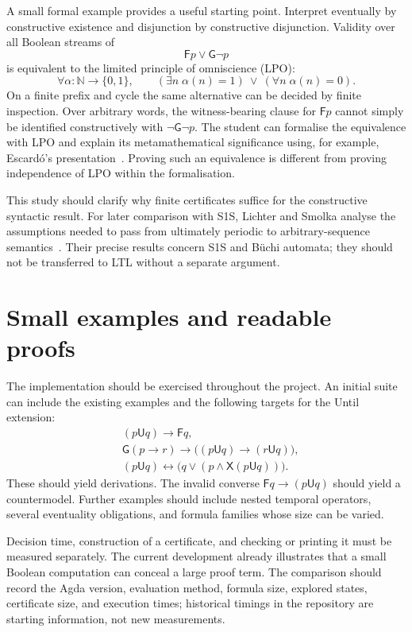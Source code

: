 \documentclass[11pt,a4paper]{article}
\newcommand{\Next}{\mathsf{X}}
\newcommand{\Always}{\mathsf{G}}
\newcommand{\Event}{\mathsf{F}}
\newcommand{\Until}{\mathbin{\mathsf{U}}}
\begin{document}
A small formal example provides a useful starting point. Interpret
eventually by constructive existence and disjunction by constructive
disjunction. Validity over all Boolean streams of
\[
 \Event p\lor\Always\neg p
\]
is equivalent to the limited principle of omniscience (LPO):
\[
 \forall\alpha:\mathbb N\to\{0,1\},\qquad
 (\exists n\;\alpha(n)=1)\ \lor\ (\forall n\;\alpha(n)=0).
\]
On a finite prefix and cycle the same alternative can be decided by finite
inspection. Over arbitrary words, the witness-bearing clause for
$\Event p$ cannot simply be identified constructively with
$\neg\Always\neg p$. The student can formalise the equivalence with LPO
and explain its metamathematical significance using, for example,
Escard\'o's presentation~\cite{escardo}. Proving such an equivalence is
different from proving independence of LPO within the formalisation.

This study should clarify why finite certificates suffice for the
constructive syntactic result. For later comparison with S1S,
Lichter and Smolka analyse the assumptions needed to pass from ultimately
periodic to arbitrary-sequence semantics~\cite{lichter}. Their precise
results concern S1S and B\"uchi automata; they should not be transferred
to LTL without a separate argument.

\section{Small examples and readable proofs}

The implementation should be exercised throughout the project. An initial
suite can include the existing examples and the following targets for
the Until extension:
\begin{align*}
 &(p\Until q)\to\Event q,\\
 &\Always(p\to r)\to\bigl((p\Until q)\to(r\Until q)\bigr),\\
 &(p\Until q)\leftrightarrow\bigl(q\lor(p\land\Next(p\Until q))\bigr).
\end{align*}
These should yield derivations. The invalid converse
$\Event q\to(p\Until q)$ should yield a countermodel.
Further examples should include nested temporal operators, several
eventuality obligations, and formula families whose size can be varied.

Decision time, construction of a certificate, and checking or printing it
must be measured separately. The current development already illustrates
that a small Boolean computation can conceal a large proof term.
The comparison should record the Agda version, evaluation method, formula
size, explored states, certificate size, and execution times; historical
timings in the repository are starting information, not new measurements.
\end{document}
